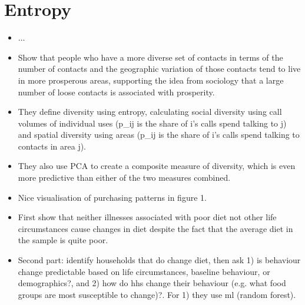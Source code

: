 

\section{Entropy}%
\label{sec:entropy}

\citet{krumme2013predictability}
\begin{itemize}
    \item ...
\end{itemize}

\citet{eagle2010network}
\begin{itemize}
    \item Show that people who have a more diverse set of contacts in terms of
        the number of contacts and the geographic variation of those contacts
        tend to live in more prosperous areas, supporting the idea from
        sociology that a large number of loose contacts is associated with
        prosperity.

    \item They define diversity using entropy, calculating social diversity
        using call volumes of individual uses (p_ij is the share of i's calls
        spend talking to j) and spatial diversity using areas (p_ij is the
        share of i's calls spend talking to contacts in area j).

    \item They also use PCA to create a composite measure of diversity, which
        is even more predictive than either of the two measures combined.
\end{itemize}


\citet{diclemente2018sequences}
\begin{itemize}
    \item Nice visualisation of purchasing patterns in figure 1.
\end{itemize}


\citet{hut2022changes}
\begin{itemize}
    \item First show that neither illnesses associated with poor diet not other
        life circumstances cause changes in diet despite the fact that the
        average diet in the sample is quite poor.

    \item Second part: identify households that do change diet, then ask 1) is
        behaviour change predictable based on life circumstances, baseline
        behaviour, or demographics?, and 2) how do hhs change their behaviour
        (e.g. what food groups are most susceptible to change)?. For 1) they
        use ml (random forest).
\end{itemize}

